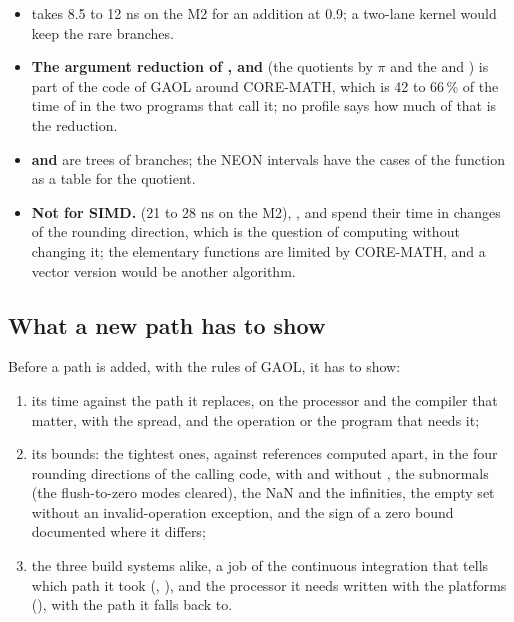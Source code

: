 \documentclass[12pt,a4paper,twoside,openright]{book}
\begin{document}
\begin{itemize}
\item[$\bullet$] \textbf{} takes 8.5 to 12 ns on the M2 for an
addition at 0.9; a two-lane kernel would keep the rare branches.
\item[$\bullet$] \textbf{The argument reduction of , 
and } (the quotients by $\pi$ and the  and
) is part of the code of GAOL around CORE-MATH, which is 42 to
66\,\% of the time of  in the two programs that call it; no
profile says how much of that is the reduction.
\item[$\bullet$] \textbf{ and \code{\%=}} are trees of
branches; the NEON intervals have the cases of the function
 as a table for the quotient.
\item[$\bullet$] \textbf{Not for SIMD.}  (21 to 28 ns on
the M2), ,  and  spend their
time in changes of the rounding direction, which is the question of
computing without changing it; the elementary functions are limited by
CORE-MATH, and a vector version would be another algorithm.
\end{itemize}

\subsection{What a new path has to show}

Before a path is added, with the rules of GAOL, it has to show:
\begin{enumerate}
\item its time against the path it replaces, on the processor and the
compiler that matter, with the spread, and the operation or the program
that needs it;
\item its bounds: the tightest ones, against references computed apart, in
the four rounding directions of the calling code, with and without
, the subnormals (the flush-to-zero modes
cleared), the NaN and the infinities, the empty set without an
invalid-operation exception, and the sign of a zero bound documented where
it differs;
\item the three build systems alike, a job of the continuous integration
that tells which path it took (,
), and the processor it needs written with the platforms
(), with the path it falls back to.
\end{enumerate}
\end{document}
